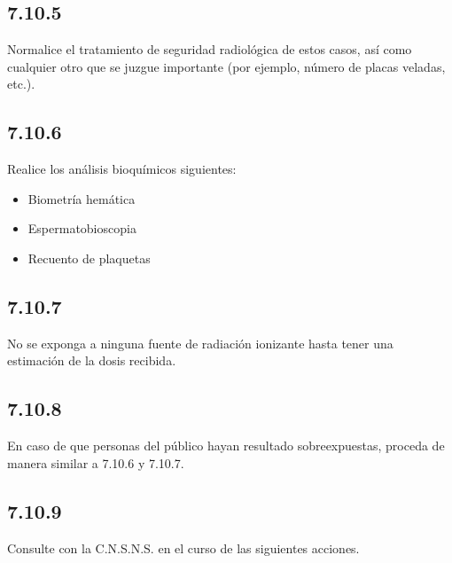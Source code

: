 \subsection*{7.10.5}
\noindent Normalice el tratamiento de seguridad radiológica de estos casos, así como cualquier otro que se juzgue importante (por ejemplo, número de placas veladas, etc.).

\subsection*{7.10.6}
\noindent Realice los análisis bioquímicos siguientes:
\begin{itemize}
    \item Biometría hemática
    \item Espermatobioscopia
    \item Recuento de plaquetas
\end{itemize}

\subsection*{7.10.7}
\noindent No se exponga a ninguna fuente de radiación ionizante hasta tener una estimación de la dosis recibida.

\subsection*{7.10.8}
\noindent En caso de que personas del público hayan resultado sobreexpuestas, proceda de manera similar a 7.10.6 y 7.10.7.

\subsection*{7.10.9}
\noindent Consulte con la C.N.S.N.S. en el curso de las siguientes acciones.